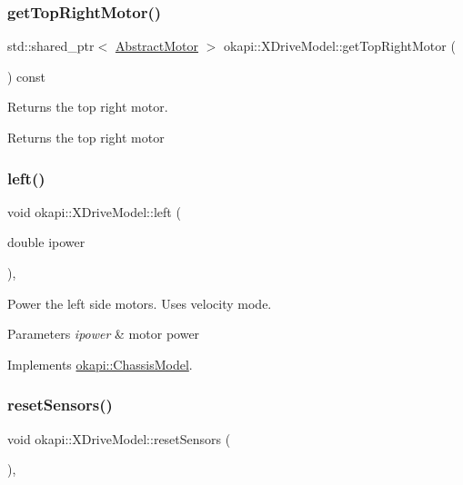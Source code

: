 \subsubsection{\texorpdfstring{getTopRightMotor()}{getTopRightMotor()}}
{\footnotesize\ttfamily std\+::shared\+\_\+ptr$<$ \mbox{\hyperlink{classokapi_1_1AbstractMotor}{Abstract\+Motor}} $>$ okapi\+::\+X\+Drive\+Model\+::get\+Top\+Right\+Motor (\begin{DoxyParamCaption}{ }\end{DoxyParamCaption}) const}

Returns the top right motor.

\begin{DoxyReturn}{Returns}
the top right motor 
\end{DoxyReturn}
\mbox{\label{classokapi_1_1XDriveModel_a0a4688df022b66164e81709e6eaa02e5}} 
\subsubsection{\texorpdfstring{left()}{left()}}
{\footnotesize\ttfamily void okapi\+::\+X\+Drive\+Model\+::left (\begin{DoxyParamCaption}\item[{double}]{ipower }\end{DoxyParamCaption})\hspace{0.3cm}{\ttfamily [override]}, {\ttfamily [virtual]}}

Power the left side motors. Uses velocity mode.


\begin{DoxyParams}{Parameters}
{\em ipower} & motor power \\
\hline
\end{DoxyParams}


Implements \mbox{\hyperlink{classokapi_1_1ChassisModel_aa2008856c169eb64c6648bc64c31c504}{okapi\+::\+Chassis\+Model}}.

\mbox{\label{classokapi_1_1XDriveModel_adbc23b11cde6aebb3c7eefb1f0251af7}} 
\subsubsection{\texorpdfstring{resetSensors()}{resetSensors()}}
{\footnotesize\ttfamily void okapi\+::\+X\+Drive\+Model\+::reset\+Sensors (\begin{DoxyParamCaption}{ }\end{DoxyParamCaption})\hspace{0.3cm}{\ttfamily [override]}, {\ttfamily [virtual]}}


